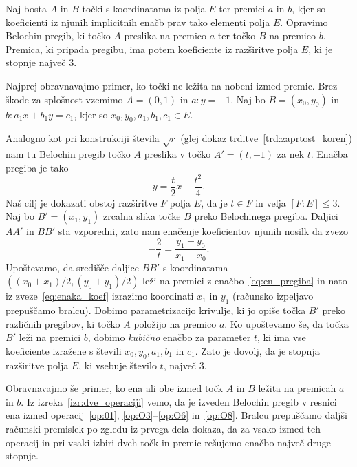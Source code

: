 \begin{lema}
    \label{lema:O7_razširitev}
    Naj bosta $A$ in $B$ točki s koordinatama iz polja $E$ ter premici $a$ in $b$, kjer so koeficienti iz njunih implicitnih enačb prav tako elementi polja $E$. Opravimo Belochin pregib, ki točko $A$ preslika na premico $a$ ter točko $B$ na premico $b$. Premica, ki pripada pregibu, ima potem koeficiente iz razširitve polja $E$, ki je stopnje največ $3$.
\end{lema}
\begin{dokaz}
    Najprej obravnavajmo primer, ko točki ne ležita na nobeni izmed premic. Brez škode za splošnost vzemimo $A = (0,1)$ in $a : y = -1$. Naj bo $B = (x_0, y_0)$ in $b : a_1 x + b_1 y = c_1$, kjer so $x_0, y_0, a_1, b_1, c_1 \in E$.

    Analogno kot pri konstrukciji števila $\sqrt{r}$ (glej dokaz trditve~\ref{trd:zaprtost_koren}) nam tu Belochin pregib točko $A$ preslika v točko $A' = (t, -1)$ za nek $t$. Enačba pregiba je tako
    \begin{equation}
        \label{eq:en_pregiba}
        y = \frac{t}{2}x - \frac{t^2}{4}.
    \end{equation}
    Naš cilj je dokazati obstoj razširitve $F$ polja $E$, da je $t \in F$ in velja $[F:E] \leq 3$. Naj bo $B' = (x_1, y_1)$ zrcalna slika točke $B$ preko Belochinega pregiba. Daljici $AA'$ in $BB'$ sta vzporedni, zato nam enačenje koeficientov njunih nosilk da zvezo
    \begin{equation}
        \label{eq:enaka_koef}
        -\frac{2}{t} = \frac{y_1 - y_0}{x_1 - x_0}.
    \end{equation}
    Upoštevamo, da središče daljice $BB'$ s koordinatama $((x_0 + x_1)/2, (y_0 + y_1)/2)$ leži na premici z enačbo~\ref{eq:en_pregiba} in nato iz zveze~\ref{eq:enaka_koef} izrazimo koordinati $x_1$ in $y_1$ (računsko izpeljavo prepuščamo bralcu). Dobimo parametrizacijo krivulje, ki jo opiše točka $B'$ preko različnih pregibov, ki točko $A$ položijo na premico $a$. Ko upoštevamo še, da točka $B'$ leži na premici $b$, dobimo \emph{kubično} enačbo za parameter $t$, ki ima vse koeficiente izražene s števili $x_0, y_0, a_1, b_1$ in $c_1$. Zato je dovolj, da je stopnja razširitve polja $E$, ki vsebuje število $t$, največ $3$.

    Obravnavajmo še primer, ko ena ali obe izmed točk $A$ in $B$ ležita na premicah $a$ in $b$. Iz izreka~\ref{izr:dve_operaciji} vemo, da je izveden Belochin pregib v resnici ena izmed operacij~\ref{op:01}, \ref{op:O3}--\ref{op:O6} in~\ref{op:O8}. Bralcu prepuščamo daljši računski premislek po zgledu iz prvega dela dokaza, da za vsako izmed teh operacij in pri vsaki izbiri dveh točk in premic rešujemo enačbo največ druge stopnje.
\end{dokaz}

